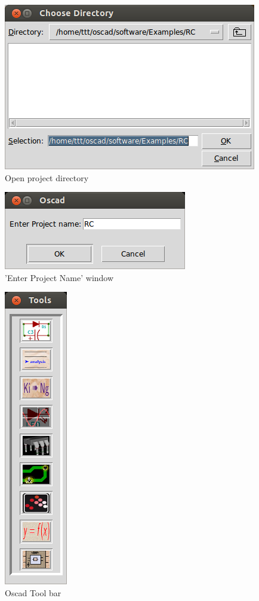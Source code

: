 \begin{figure}
\begin{center}
\includegraphics[width=0.5\linewidth]{figures/open-project-directory.png}
\caption{Open project directory}
\label{open-directory}
\end{center}
\end{figure}

\begin{figure}
\begin{center}
\includegraphics[width=0.5\linewidth]{figures/project-name.png}
\caption{'Enter Project Name' window}
\label{project-name}
\end{center}
\end{figure}



\begin{figure}
\begin{center}
\includegraphics[width=0.2\linewidth]{figures/tool-window.png}
\caption{Oscad Tool bar}
\label{tool-window}
\end{center}
\end{figure}


